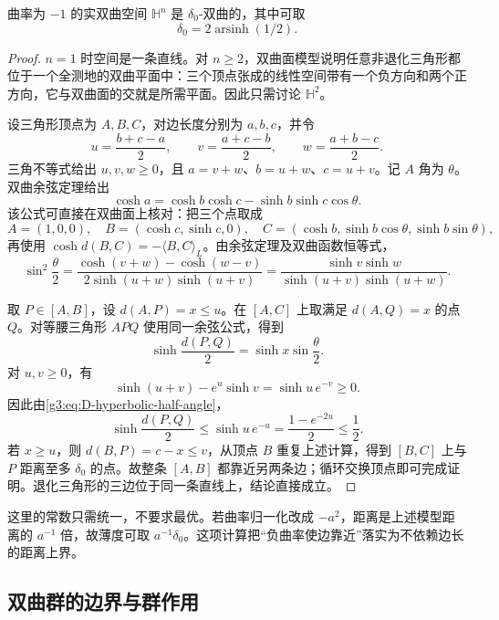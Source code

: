 \begin{proposition}\label{g3:prop:D-hyperbolic-space-thin}
	曲率为 \(-1\) 的实双曲空间 \(\mathbb H^n\) 是 \(\delta_0\)-双曲的，其中可取
	\[
		\delta_0=2\operatorname{arsinh}(1/2).
	\]
\end{proposition}
\begin{proof}
	\(n=1\) 时空间是一条直线。对 \(n\ge2\)，双曲面模型说明任意非退化三角形都位于一个全测地的双曲平面中：三个顶点张成的线性空间带有一个负方向和两个正方向，它与双曲面的交就是所需平面。因此只需讨论 \(\mathbb H^2\)。

	设三角形顶点为 \(A,B,C\)，对边长度分别为 \(a,b,c\)，并令
	\[
		u=\frac{b+c-a}{2},\qquad
		v=\frac{a+c-b}{2},\qquad
		w=\frac{a+b-c}{2}.
	\]
	三角不等式给出 \(u,v,w\ge0\)，且 \(a=v+w\)、\(b=u+w\)、\(c=u+v\)。记 \(A\) 角为 \(\theta\)。双曲余弦定理给出
	\[
		\cosh a=\cosh b\cosh c-\sinh b\sinh c\cos\theta.
	\]
	该公式可直接在双曲面上核对：把三个点取成
	\[
		A=(1,0,0),\quad B=(\cosh c,\sinh c,0),\quad
		C=(\cosh b,\sinh b\cos\theta,\sinh b\sin\theta),
	\]
	再使用 \(\cosh d(B,C)=-\langle B,C\rangle_L\)。由余弦定理及双曲函数恒等式，
	\begin{equation}\label{g3:eq:D-hyperbolic-half-angle}
		\sin^2\frac\theta2
		=\frac{\cosh(v+w)-\cosh(w-v)}{2\sinh(u+w)\sinh(u+v)}
		=\frac{\sinh v\sinh w}{\sinh(u+v)\sinh(u+w)}.
	\end{equation}

	取 \(P\in[A,B]\)，设 \(d(A,P)=x\le u\)。在 \([A,C]\) 上取满足 \(d(A,Q)=x\) 的点 \(Q\)。对等腰三角形 \(APQ\) 使用同一余弦公式，得到
	\[
		\sinh\frac{d(P,Q)}2=\sinh x\sin\frac\theta2.
	\]
	对 \(u,v\ge0\)，有
	\[
		\sinh(u+v)-e^u\sinh v=\sinh u\,e^{-v}\ge0.
	\]
	因此由\cref{g3:eq:D-hyperbolic-half-angle}，
	\[
		\sinh\frac{d(P,Q)}2\le\sinh u\,e^{-u}
		=\frac{1-e^{-2u}}2\le\frac12.
	\]
	若 \(x\ge u\)，则 \(d(B,P)=c-x\le v\)，从顶点 \(B\) 重复上述计算，得到 \([B,C]\) 上与 \(P\) 距离至多 \(\delta_0\) 的点。故整条 \([A,B]\) 都靠近另两条边；循环交换顶点即可完成证明。退化三角形的三边位于同一条直线上，结论直接成立。
\end{proof}

这里的常数只需统一，不要求最优。若曲率归一化改成 \(-a^2\)，距离是上述模型距离的 \(a^{-1}\) 倍，故薄度可取 \(a^{-1}\delta_0\)。这项计算把“负曲率使边靠近”落实为不依赖边长的距离上界。

\subsection{双曲群的边界与群作用}
\label{g3:subsec:D03:03}

